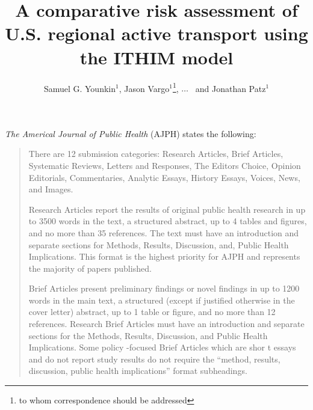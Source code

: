 \documentclass{bioinfo}
\begin{document}

\title[]{A comparative risk assessment of U.S. regional active
  transport using the ITHIM model}
\author[Younkin \textit{et~al}]{Samuel G. Younkin$^{1}$,
  Jason Vargo$^{1}$\footnote{to whom correspondence should be addressed},
  $\ldots$
  \ and Jonathan Patz$^{1}$}
\address{$^{1}$Global Health Institute\\
University of Wisconsin{\textendash}Madison, Madison, WI USA\\
}


\maketitle

\begin{abstract}

\end{abstract}

\textit{The Americal Journal of Public Health} (AJPH) states the following:

\begin{quote}
There are 12 submission categories: Research Articles, Brief
Articles, Systematic Reviews, Letters and Responses, The Editors
Choice, Opinion Editorials, Commentaries, Analytic Essays, History
Essays, Voices, News, and Images.

Research Articles report the results of original public health
research in up to 3500 words in the text, a structured abstract, up to
4 tables and figures, and no more than 35 references. The text must
have an introduction and separate sections for Methods, Results,
Discussion, and, Public Health Implications. This format is the
highest priority for AJPH and represents the majority of papers
published.

Brief Articles present preliminary findings or novel findings in up to
1200 words in the main text, a structured (except if justified
otherwise in the cover letter) abstract, up to 1 table or figure, and
no more than 12 references.  Research Brief Articles must have an
introduction and separate sections for the Methods, Results,
Discussion, and Public Health Implications. Some policy -focused Brief
Articles which are shor t essays and do not report study results do
not require the “method, results, discussion, public health
implications” format subheadings.
\end{quote}
\end{document}
